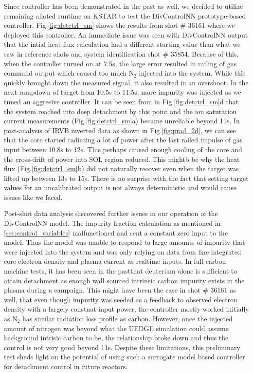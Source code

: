 Since \Afrac controller has been demonstrated in the past as well, we decided to utilize remaining alloted runtime on KSTAR to test the DivControlNN prototype-based controller.
Fig.\ref{fig:detctrl_sm} shows the results from shot \# 36161 where we deployed this controller.
An immediate issue was seen with DivControlNN output that the intial heat flux calculation had a different starting value than what we saw in reference shots and system identification shot \# 35854.
Because of this, when the controller turned on at 7.5s, the large error resulted in railing of gas command output which caused too much N$_2$ injected into the system.
While this quickly brought down the measured signal, it also resulted in an overshoot.
In the next rampdown of target from 10.5s to 11.5s, more impurity was injected as we tuned an aggresive controller.
It can be seen from \Afrac in Fig.\ref{fig:detctrl_sm}d that the system reached into deep detachment by this point and the ion saturation current measurements (Fig.\ref{fig:detctrl_sm}a) became unreliable beyond 11s.
In post-analysis of IRVB inverted data as shown in Fig.\ref{fig:prad_2d}, we can see that the core started radiating a lot of power after the last railed impulse of gas input between 10.8s to 12s.
This perhaps caused enough cooling of the core and the cross-drift of power into \ac{SOL} region reduced.
This mightb be why the heat flux (Fig.\ref{fig:detctrl_sm}b) did not naturally recover even when the target was lifted up between 13s to 15s.
There is no surprise with the fact that setting target values for an uncalibrated output is not always deterministic and would cause issues like we faced.

Post-shot data analysis discovered further issues in our operation of the DivControlNN model.
The impurity fraction calculation as mentioned in \ref{sec:control_variables} malfunctioned and sent a constant zero input to the model.
Thus the model was unable to respond to large amounts of impurity that were injected into the system and was only relying on data from line integrated core electron density and plasma current as realtime inputs.
In full carbon machine tests, it has been seen in the past\needcite that deuterium alone is sufficient to attain detachment as enough wall sourced intrinsic carbon impurity exists in the plasma during a campaign.
This might have been the case in shot \# 36161 as well, that even though impurity was seeded as a feedback to observed electron density with a largely constnat input power, the controller mostly worked initially as N$_2$ has similar radiation loss profile as carbon.
However, once the injected amount of nitrogen was beyond what the UEDGE simulation could assume background intrisic carbon to be, the relationship broke down and thus the control is not very good beyond 11s.
Despite these limitations, this preliminary test sheds light on the potential of using such a surrogate model based controller for detachment control in future reactors.